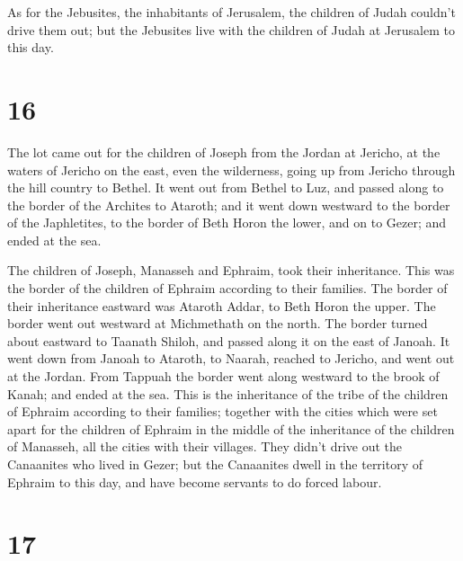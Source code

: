  As for the Jebusites, the inhabitants of Jerusalem, the
children of Judah couldn't drive them out; but the Jebusites live with
the children of Judah at Jerusalem to this day.

\hypertarget{section-15}{%
\section{16}\label{section-15}}

 The lot came out for the children of Joseph from the
Jordan at Jericho, at the waters of Jericho on the east, even the
wilderness, going up from Jericho through the hill country to Bethel.
 It went out from Bethel to Luz, and passed along to the
border of the Archites to Ataroth;  and it went down
westward to the border of the Japhletites, to the border of Beth Horon
the lower, and on to Gezer; and ended at the sea.

 The children of Joseph, Manasseh and Ephraim, took their
inheritance.  This was the border of the children of
Ephraim according to their families. The border of their inheritance
eastward was Ataroth Addar, to Beth Horon the upper.  The
border went out westward at Michmethath on the north. The border turned
about eastward to Taanath Shiloh, and passed along it on the east of
Janoah.  It went down from Janoah to Ataroth, to Naarah,
reached to Jericho, and went out at the Jordan.  From
Tappuah the border went along westward to the brook of Kanah; and ended
at the sea. This is the inheritance of the tribe of the children of
Ephraim according to their families;  together with the
cities which were set apart for the children of Ephraim in the middle of
the inheritance of the children of Manasseh, all the cities with their
villages.  They didn't drive out the Canaanites who lived
in Gezer; but the Canaanites dwell in the territory of Ephraim to this
day, and have become servants to do forced labour.

\hypertarget{section-16}{%
\section{17}\label{section-16}}

